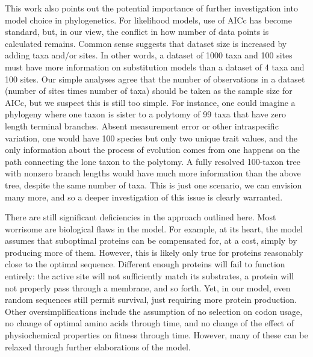 \documentclass[12pt,letterpaper]{article}
\begin{document}
This work also points out the potential importance of further investigation into model choice in phylogenetics.
For likelihood models, use of AICc has become standard, but, in our view, the conflict in how number of data points is calculated remains.
Common sense suggests that dataset size is increased by adding taxa and/or sites.
In other words, a dataset of 1000 taxa and 100 sites must have more information on substitution models than a dataset of 4 taxa and 100 sites.
Our simple analyses agree that the number of observations in a dataset (number of sites times number of taxa) should be taken as the sample size for AICc, but we suspect this is still too simple.
For instance, one could imagine a phylogeny where one taxon is sister to a polytomy of 99 taxa that have zero length terminal branches.
Absent measurement error or other intraspecific variation, one would have 100 species but only two unique trait values, and the only information about the process of evolution comes from one happens on the path connecting the lone taxon to the polytomy.
A fully resolved 100-taxon tree with nonzero branch lengths would have much more information than the above tree, despite the same number of taxa.
This is just one scenario, we can envision many more, and so a deeper investigation of this issue is clearly warranted.

There are still significant deficiencies in the approach outlined here.
Most worrisome are biological flaws in the model.
For example, at its heart, the model assumes that suboptimal proteins can be compensated for, at a cost, simply by producing more of them.
However, this is likely only true for proteins reasonably close to the optimal sequence.
Different enough proteins will fail to function entirely: the active site will not sufficiently match its substrates, a protein will not properly pass through a membrane, and so forth.
Yet, in our model, even random sequences still permit survival, just requiring more protein production.
Other oversimplifications include the assumption of no selection on codon usage, no change of optimal amino acids through time, and no change of the effect of physiochemical properties on fitness through time.
However, many of these can be relaxed through further elaborations of the model.
\end{document}
